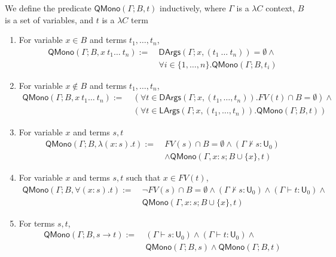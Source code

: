 \begin{definition} We define the predicate $\mathsf{QMono}(\Gamma; B, t)$ inductively,
  where $\Gamma$ is a $\lambda C$ context, $B$ is a set of variables, and $t$ is a $\lambda C$ term
  \begin{enumerate}
    \item For variable $x \in B$ and terms $t_1, \dots, t_n$,
      \begin{align*}
        \mathsf{QMono}(\Gamma; B, x \ t_1 \dots \ t_n) := \ &
        \mathsf{DArgs}(\Gamma; x, (t_1 \ \dots \ t_n)) = \emptyset \land \\
        & \forall i \in \{1, \dots, n\}. \mathsf{QMono}(\Gamma; B, t_i)
      \end{align*}
    \item For variable $x \notin B$ and terms $t_1, \dots, t_n$,
      \begin{align*}
        \mathsf{QMono}(\Gamma; B, x \ t_1 \dots \ t_n) := \ & (\forall t \in \mathsf{DArgs}(\Gamma; x, (t_1, \dots, t_n)). FV(t) \cap B = \emptyset) \land \\
        & (\forall t \in \mathsf{LArgs}(\Gamma; x, (t_1, \dots, t_n)). \mathsf{QMono}(\Gamma; B, t))
      \end{align*}
    \item For variable $x$ and terms $s, t$
      \begin{align*}
        \mathsf{QMono}(\Gamma; B, \lambda (x : s). t) := \
        & FV(s) \cap B = \emptyset \land (\Gamma \not\vdash s : \mathsf{U}_0) \\
        & \land \mathsf{QMono}(\Gamma, x : s; B \cup \{x\}, t)
      \end{align*}
    \item For variable $x$ and terms $s, t$ such that $x \in FV(t)$,
      \begin{align*}
        \mathsf{QMono}(\Gamma; B, \forall (x : s). t) := \
        & \neg FV(s) \cap B = \emptyset \land (\Gamma \not \vdash s : \mathsf{U}_0) \land  (\Gamma \vdash t : \mathsf{U}_0) \land \\
        & \mathsf{QMono}(\Gamma, x : s; B \cup \{x\}, t)
      \end{align*}
    \item For terms $s, t$,
      \begin{align*}
        \mathsf{QMono}(\Gamma; B, s \to t) := \ & (\Gamma \vdash s : \mathsf{U}_0) \land (\Gamma \vdash t : \mathsf{U}_0) \land \\
        & \mathsf{QMono}(\Gamma; B, s) \land \mathsf{QMono}(\Gamma; B, t)
      \end{align*}
  \end{enumerate}
\end{definition}

